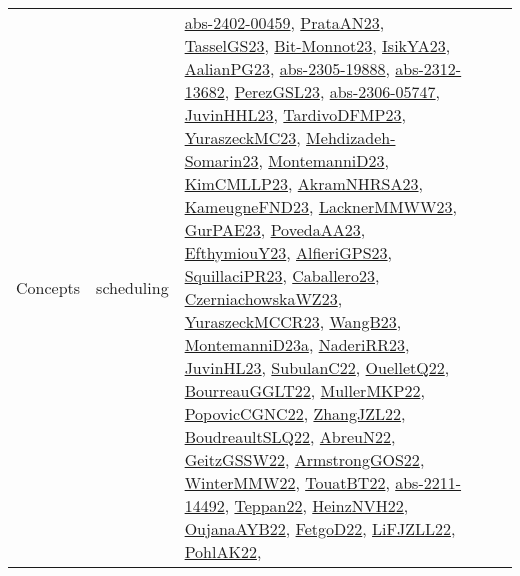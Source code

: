 {\begin{longtable}{lp{3cm}>{\raggedright}p{6cm}>{\raggedright}p{6cm}p{8cm}}
Concepts & scheduling & \href{articles/abs-2402-00459.pdf}{abs-2402-00459}\cite{abs-2402-00459}, \href{articles/PrataAN23.pdf}{PrataAN23}\cite{PrataAN23}, \href{papers/TasselGS23.pdf}{TasselGS23}\cite{TasselGS23}, \href{papers/Bit-Monnot23.pdf}{Bit-Monnot23}\cite{Bit-Monnot23}, \href{articles/IsikYA23.pdf}{IsikYA23}\cite{IsikYA23}, \href{papers/AalianPG23.pdf}{AalianPG23}\cite{AalianPG23}, \href{articles/abs-2305-19888.pdf}{abs-2305-19888}\cite{abs-2305-19888}, \href{articles/abs-2312-13682.pdf}{abs-2312-13682}\cite{abs-2312-13682}, \href{papers/PerezGSL23.pdf}{PerezGSL23}\cite{PerezGSL23}, \href{articles/abs-2306-05747.pdf}{abs-2306-05747}\cite{abs-2306-05747}, \href{papers/JuvinHHL23.pdf}{JuvinHHL23}\cite{JuvinHHL23}, \href{papers/TardivoDFMP23.pdf}{TardivoDFMP23}\cite{TardivoDFMP23}, \href{papers/YuraszeckMC23.pdf}{YuraszeckMC23}\cite{YuraszeckMC23}, \href{papers/Mehdizadeh-Somarin23.pdf}{Mehdizadeh-Somarin23}\cite{Mehdizadeh-Somarin23}, \href{articles/MontemanniD23.pdf}{MontemanniD23}\cite{MontemanniD23}, \href{papers/KimCMLLP23.pdf}{KimCMLLP23}\cite{KimCMLLP23}, \href{articles/AkramNHRSA23.pdf}{AkramNHRSA23}\cite{AkramNHRSA23}, \href{papers/KameugneFND23.pdf}{KameugneFND23}\cite{KameugneFND23}, \href{articles/LacknerMMWW23.pdf}{LacknerMMWW23}\cite{LacknerMMWW23}, \href{articles/GurPAE23.pdf}{GurPAE23}\cite{GurPAE23}, \href{papers/PovedaAA23.pdf}{PovedaAA23}\cite{PovedaAA23}, \href{papers/EfthymiouY23.pdf}{EfthymiouY23}\cite{EfthymiouY23}, \href{articles/AlfieriGPS23.pdf}{AlfieriGPS23}\cite{AlfieriGPS23}, \href{papers/SquillaciPR23.pdf}{SquillaciPR23}\cite{SquillaciPR23}, \href{articles/Caballero23.pdf}{Caballero23}\cite{Caballero23}, \href{articles/CzerniachowskaWZ23.pdf}{CzerniachowskaWZ23}\cite{CzerniachowskaWZ23}, \href{articles/YuraszeckMCCR23.pdf}{YuraszeckMCCR23}\cite{YuraszeckMCCR23}, \href{papers/WangB23.pdf}{WangB23}\cite{WangB23}, \href{articles/MontemanniD23a.pdf}{MontemanniD23a}\cite{MontemanniD23a}, \href{articles/NaderiRR23.pdf}{NaderiRR23}\cite{NaderiRR23}, \href{papers/JuvinHL23.pdf}{JuvinHL23}\cite{JuvinHL23}, \href{articles/SubulanC22.pdf}{SubulanC22}\cite{SubulanC22}, \href{papers/OuelletQ22.pdf}{OuelletQ22}\cite{OuelletQ22}, \href{articles/BourreauGGLT22.pdf}{BourreauGGLT22}\cite{BourreauGGLT22}, \href{articles/MullerMKP22.pdf}{MullerMKP22}\cite{MullerMKP22}, \href{papers/PopovicCGNC22.pdf}{PopovicCGNC22}\cite{PopovicCGNC22}, \href{papers/ZhangJZL22.pdf}{ZhangJZL22}\cite{ZhangJZL22}, \href{papers/BoudreaultSLQ22.pdf}{BoudreaultSLQ22}\cite{BoudreaultSLQ22}, \href{articles/AbreuN22.pdf}{AbreuN22}\cite{AbreuN22}, \href{papers/GeitzGSSW22.pdf}{GeitzGSSW22}\cite{GeitzGSSW22}, \href{papers/ArmstrongGOS22.pdf}{ArmstrongGOS22}\cite{ArmstrongGOS22}, \href{papers/WinterMMW22.pdf}{WinterMMW22}\cite{WinterMMW22}, \href{papers/TouatBT22.pdf}{TouatBT22}\cite{TouatBT22}, \href{articles/abs-2211-14492.pdf}{abs-2211-14492}\cite{abs-2211-14492}, \href{papers/Teppan22.pdf}{Teppan22}\cite{Teppan22}, \href{articles/HeinzNVH22.pdf}{HeinzNVH22}\cite{HeinzNVH22}, \href{papers/OujanaAYB22.pdf}{OujanaAYB22}\cite{OujanaAYB22}, \href{articles/FetgoD22.pdf}{FetgoD22}\cite{FetgoD22}, \href{papers/LiFJZLL22.pdf}{LiFJZLL22}\cite{LiFJZLL22}, \href{articles/PohlAK22.pdf}{PohlAK22}\cite{PohlAK22}, 
\end{longtable}}

